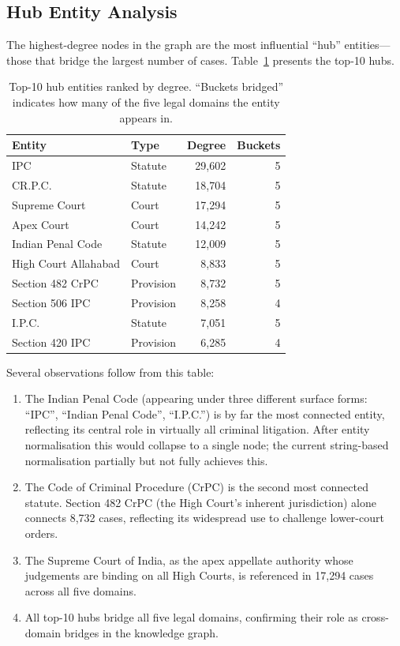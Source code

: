 \documentclass[12pt,a4paper]{report}
\begin{document}
\subsection{Hub Entity Analysis}
\label{sec:hub_entities}

The highest-degree nodes in the graph are the most influential ``hub'' entities---those that bridge the largest number of cases. Table~\ref{tab:top_hubs} presents the top-10 hubs.

\begin{table}[H]
  \centering
  \caption{Top-10 hub entities ranked by degree. ``Buckets bridged'' indicates how many of the five legal domains the entity appears in.}
  \label{tab:top_hubs}
  \begin{tabular}{llrr}
    \toprule
    \textbf{Entity} & \textbf{Type} & \textbf{Degree} & \textbf{Buckets} \\
    \midrule
    IPC & Statute & 29,602 & 5 \\
    CR.P.C. & Statute & 18,704 & 5 \\
    Supreme Court & Court & 17,294 & 5 \\
    Apex Court & Court & 14,242 & 5 \\
    Indian Penal Code & Statute & 12,009 & 5 \\
    High Court Allahabad & Court & 8,833 & 5 \\
    Section 482 CrPC & Provision & 8,732 & 5 \\
    Section 506 IPC & Provision & 8,258 & 4 \\
    I.P.C. & Statute & 7,051 & 5 \\
    Section 420 IPC & Provision & 6,285 & 4 \\
    \bottomrule
  \end{tabular}
\end{table}

Several observations follow from this table:

\begin{enumerate}
  \item The Indian Penal Code (appearing under three different surface forms: ``IPC'', ``Indian Penal Code'', ``I.P.C.'') is by far the most connected entity, reflecting its central role in virtually all criminal litigation. After entity normalisation this would collapse to a single node; the current string-based normalisation partially but not fully achieves this.
  \item The Code of Criminal Procedure (CrPC) is the second most connected statute. Section 482 CrPC (the High Court's inherent jurisdiction) alone connects 8,732 cases, reflecting its widespread use to challenge lower-court orders.
  \item The Supreme Court of India, as the apex appellate authority whose judgements are binding on all High Courts, is referenced in 17,294 cases across all five domains.
  \item All top-10 hubs bridge all five legal domains, confirming their role as cross-domain bridges in the knowledge graph.
\end{enumerate}
\end{document}
